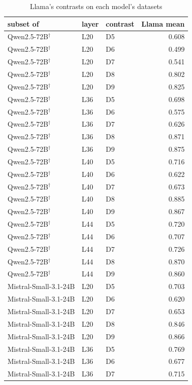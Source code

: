\begin{table}
\caption{Llama's contrasts on each model's datasets}
\label{tab:x-zero_shot_llama_subsets}
\begin{tabular}{lllr}
\toprule
subset of & layer & contrast & Llama mean \\
\midrule
Qwen2.5-72B$^\dagger$ & L20 & D5 & 0.608 \\
Qwen2.5-72B$^\dagger$ & L20 & D6 & 0.499 \\
Qwen2.5-72B$^\dagger$ & L20 & D7 & 0.541 \\
Qwen2.5-72B$^\dagger$ & L20 & D8 & 0.802 \\
Qwen2.5-72B$^\dagger$ & L20 & D9 & 0.825 \\
Qwen2.5-72B$^\dagger$ & L36 & D5 & 0.698 \\
Qwen2.5-72B$^\dagger$ & L36 & D6 & 0.575 \\
Qwen2.5-72B$^\dagger$ & L36 & D7 & 0.626 \\
Qwen2.5-72B$^\dagger$ & L36 & D8 & 0.871 \\
Qwen2.5-72B$^\dagger$ & L36 & D9 & 0.875 \\
Qwen2.5-72B$^\dagger$ & L40 & D5 & 0.716 \\
Qwen2.5-72B$^\dagger$ & L40 & D6 & 0.622 \\
Qwen2.5-72B$^\dagger$ & L40 & D7 & 0.673 \\
Qwen2.5-72B$^\dagger$ & L40 & D8 & 0.885 \\
Qwen2.5-72B$^\dagger$ & L40 & D9 & 0.867 \\
Qwen2.5-72B$^\dagger$ & L44 & D5 & 0.720 \\
Qwen2.5-72B$^\dagger$ & L44 & D6 & 0.707 \\
Qwen2.5-72B$^\dagger$ & L44 & D7 & 0.726 \\
Qwen2.5-72B$^\dagger$ & L44 & D8 & 0.870 \\
Qwen2.5-72B$^\dagger$ & L44 & D9 & 0.860 \\
Mistral-Small-3.1-24B & L20 & D5 & 0.703 \\
Mistral-Small-3.1-24B & L20 & D6 & 0.620 \\
Mistral-Small-3.1-24B & L20 & D7 & 0.653 \\
Mistral-Small-3.1-24B & L20 & D8 & 0.846 \\
Mistral-Small-3.1-24B & L20 & D9 & 0.866 \\
Mistral-Small-3.1-24B & L36 & D5 & 0.769 \\
Mistral-Small-3.1-24B & L36 & D6 & 0.677 \\
Mistral-Small-3.1-24B & L36 & D7 & 0.715 \\

\end{tabular}
\end{table}
